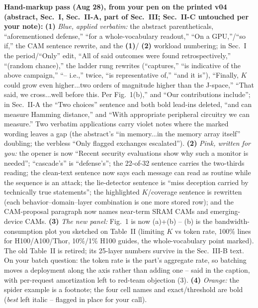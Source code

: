 \documentclass[conference]{IEEEtran}
\newcommand{\cam}{{CAM}\xspace}
\begin{document}
{\begin{pnote}[aiviolet]
\textbf{Hand-markup pass (Aug 28), from your pen on the printed v04
(abstract, Sec.~I, Sec.~II-A, part of Sec.~III; Sec.~II-C untouched
per your note):}
{\bf (1)} \emph{Blue, applied verbatim:} the abstract parentheticals,
``aforementioned defense,'' ``for a whole-vocabulary readout,'' ``On a
GPU,''/``so if,'' the CAM sentence rewrite, and the {\bf (1)}/{\bf
(2)} workload numbering; in Sec.~I the period/``Only'' edit, ``All of
said outcomes were found retrospectively,'' ``(random chance),'' the
ladder rung rewrites (``captures,'' ``is indicative of the above
campaign,'' ``-- i.e.,'' twice, ``is representative of,'' ``and it
is''), ``Finally, $K$ could grow even higher...two orders of magnitude
higher than the J-space,'' ``That said, we cross...well before this.
Per Fig.~1(b),'' and ``Our contributions include''; in Sec.~II-A the
``Two choices'' sentence and both bold lead-ins deleted, ``and can
measure Hamming distance,'' and ``With appropriate peripheral
circuitry we can measure.'' Two verbatim applications carry violet
notes where the marked wording leaves a gap (the abstract's ``in
memory...in the memory array itself'' doubling; the verbless ``Only
flagged exchanges escalated'').
{\bf (2)} \emph{Pink, written for you:} the opener is now ``Recent
security evaluations show why such a monitor is needed''; ``cascade's''
is ``defense's''; the 22-of-32 sentence carries the two-thirds
reading; the clean-text sentence now says each message can read as
routine while the sequence is an attack; the lie-detector sentence is
``miss deception carried by technically true statements''; the
highlighted $K$/coverage sentence is rewritten (each
behavior--domain--layer combination is one more stored row); and the
CAM-proposal paragraph now names near-term SRAM \cam{}s and
emerging-device \cam{}s.
{\bf (3)} \emph{The new panel:} Fig.~1 is now (a)+(b) --
(b) is the bandwidth-consumption plot you sketched on Table~II
(limiting $K$ vs token rate, 100\% lines for H100/A100/Thor, 10\%/1\%
H100 guides, the whole-vocabulary point marked). The old Table~II is
retired; its 25-layer numbers survive in the Sec.~III-B text. On your
batch question: the token rate is the part's aggregate rate, so
batching moves a deployment along the axis rather than adding one --
said in the caption, with per-request amortization left to red-team
objection (3).
{\bf (4)} \emph{Orange:} the spider example is a footnote; the four
cell names and exact/threshold are bold (\emph{best} left italic --
flagged in place for your call).


\end{pnote}}
\end{document}
